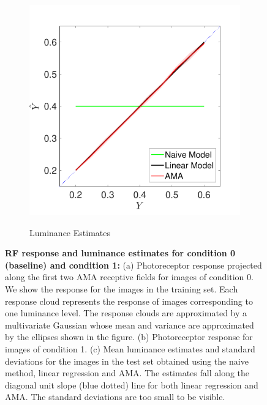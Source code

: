 \documentclass{jov}
\begin{document}
\begin{figure}
\begin{subfigure}[b]{0.3 \textwidth}
        \label{fig:case1RFResponse}
    \end{subfigure}    
            \begin{subfigure}[b]{0.297 \textwidth}
        \caption{Luminance Estimates}
        \includegraphics[width=\textwidth]{../Figures/Figure9/Figure9_b.pdf}
        \label{fig:case9Results}
    \end{subfigure}    
    \caption{{\bf RF response and luminance estimates for condition 0 (baseline) and condition 1:} (a) Photoreceptor response projected along the first two AMA receptive fields for images of condition 0. We show the response for the images in the training set. Each response cloud represents the response of images corresponding to one luminance level. The response clouds are approximated by a multivariate Gaussian whose mean and variance are approximated by the ellipses shown in the figure. (b) Photoreceptor response for images of condition 1. (c) Mean luminance estimates and standard deviations for the images in the test set obtained using the naive method, linear regression and AMA. The estimates fall along the diagonal unit slope (blue dotted) line for both linear regression and AMA. The standard deviations are too small to be visible.}
\label{fig:sourcesOfNoise}
\end{figure}
\end{document}
